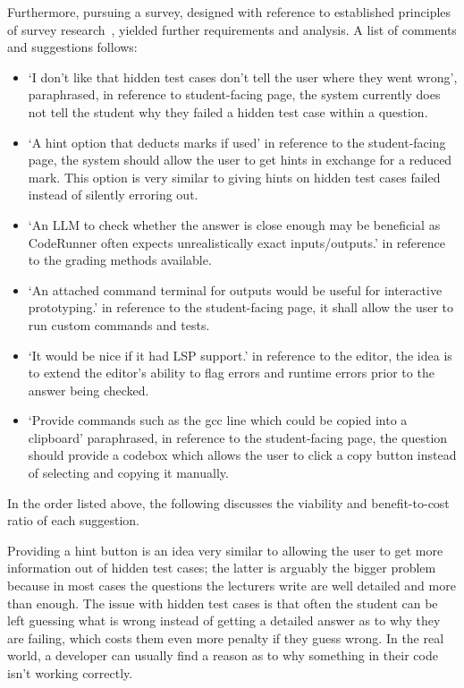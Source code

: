 Furthermore, pursuing a survey, designed with reference to established principles of survey research~\cite{designingsurvey}, yielded further requirements and analysis. A list of comments and suggestions follows:
\begin{itemize} 
  \item `I don't like that hidden test cases don't tell the user where they went wrong', paraphrased, in reference to student-facing page, the system currently does not tell the student why they failed a hidden test case within a question.
  \item `A hint option that deducts marks if used' in reference to the student-facing page, the system should allow the user to get hints in exchange for a reduced mark.
    This option is very similar to giving hints on hidden test cases failed instead of silently erroring out.
  \item `An LLM to check whether the answer is close enough may be beneficial as CodeRunner often expects unrealistically exact inputs/outputs.' in reference to the grading methods available.
  \item `An attached command terminal for outputs would be useful for interactive prototyping.' in reference to the student-facing page, it shall allow the user to run custom commands and tests.
  \item `It would be nice if it had LSP support.' in reference to the editor, the idea is to extend the editor's ability to flag errors and runtime errors prior to the answer being checked.
  \item `Provide commands such as the gcc line which could be copied into a clipboard' paraphrased, in reference to the student-facing page, the question should provide a codebox which allows the user to click a copy button instead of selecting and copying it manually.

\end{itemize}

In the order listed above, the following discusses the viability and benefit-to-cost ratio of each suggestion.

Providing a hint button is an idea very similar to allowing the user to get more information out of hidden test cases; the latter is arguably the bigger problem because in most cases the questions the lecturers write are well detailed and more than enough. The issue with hidden test cases is that often the student can be left guessing what is wrong instead of getting a detailed answer as to why they are failing, which costs them even more penalty if they guess wrong. In the real world, a developer can usually find a reason as to why something in their code isn't working correctly.

